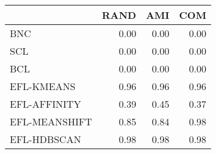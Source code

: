\begin{tabular}{lrrr}
\toprule
 & RAND & AMI & COM \\
\midrule
BNC & 0.00 & 0.00 & 0.00 \\
SCL & 0.00 & 0.00 & 0.00 \\
BCL & 0.00 & 0.00 & 0.00 \\
EFL-KMEANS & 0.96 & 0.96 & 0.96 \\
EFL-AFFINITY & 0.39 & 0.45 & 0.37 \\
EFL-MEANSHIFT & 0.85 & 0.84 & 0.98 \\
EFL-HDBSCAN & 0.98 & 0.98 & 0.98 \\
\bottomrule
\end{tabular}
